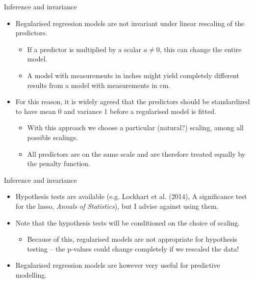 \documentclass[10pt,handout]{beamer}
\begin{document}
\begin{frame}{Inference and invariance}
\begin{itemize}
\item Regularised regression models are not invariant under linear rescaling of the predictors.\pause
\begin{itemize}
\item If a predictor is multiplied by a scalar $a\neq 0$, this can change the entire model.\pause
\item A model with measurements in inches might yield completely different results from a model with measurements in cm.\\[3mm]\pause
\end{itemize}
\item For this reason, it is widely agreed that the predictors should be standardized to have mean 0 and variance 1 before a regularised model is fitted.\pause
\begin{itemize}
\item With this approach we choose a particular (natural?) scaling, among all possible scalings.\pause
\item All predictors are on the same scale and are therefore treated equally by the penalty function.\pause
\end{itemize}
\end{itemize}
\end{frame}

\begin{frame}{Inference and invariance}
\begin{itemize}
\item Hypothesis tests are available (e.g. Lockhart et al. (2014), A significance test for the lasso, \emph{Annals of Statistics}), but I advise against using them.\\[3mm]\pause
\item Note that the hypothesis tests will be conditioned on the choice of scaling.\pause
\begin{itemize}
\item Because of this, regularised models are not appropriate for hypothesis testing -- the p-values could change completely if we rescaled the data!\\[3mm]\pause
\end{itemize}
\item Regularised regression models are however very useful for {\color{uured}predictive modelling}.
\end{itemize}
\end{frame}
\end{document}
